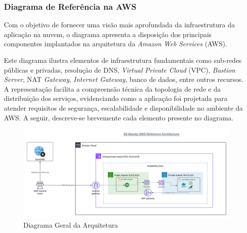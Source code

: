 \subsubsection{Diagrama de Referência na AWS}

Com o objetivo de fornecer uma visão mais aprofundada da infraestrutura da aplicação na nuvem, o diagrama apresenta a disposição dos principais componentes implantados na arquitetura da \emph{Amazon Web Services} (AWS). 

Este diagrama ilustra elementos de infraestrutura fundamentais como sub-redes públicas e privadas, resolução de DNS, \emph{Virtual Private Cloud} (VPC), \emph{Bastion Server}, NAT \emph{Gateway}, \emph{Internet Gateway}, banco de dados, entre outros recursos. A representação facilita a compreensão técnica da topologia de rede e da distribuição dos serviços, evidenciando como a aplicação foi projetada para atender requisitos de segurança, escalabilidade e disponibilidade no ambiente da AWS. A seguir, descreve-se brevemente cada elemento presente no diagrama.

\begin{figure}[htb]
  \centering
  \includegraphics[width=\textwidth]{cap04-desenvolvimento/images/4-3-2-3-diagrama-geral}
  \caption{Diagrama Geral da Arquitetura}
  \label{fig:diagrama-geral}
\end{figure}

